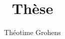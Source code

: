 \documentclass[a4paper,twoside,11pt]{memoir}
\begin{document}
\frontmatter

\author{Théotime Grohens}
\title{Thèse}

\maketitle

\pagebreak

\tableofcontents
\listoffigures

\mainmatter









\end{document}
